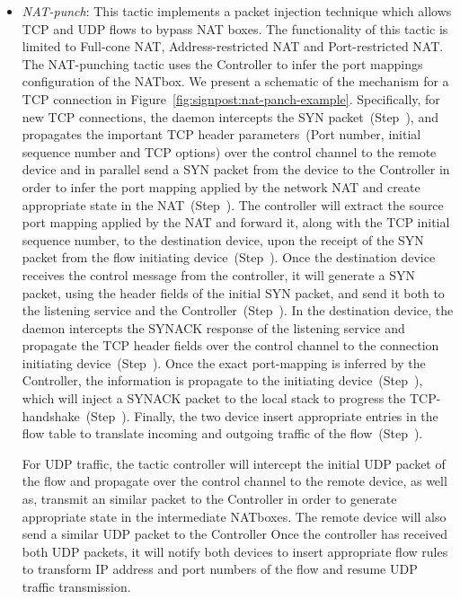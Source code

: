 \begin{itemize}
  \item \emph{NAT-punch}: This tactic implements a packet injection technique which
    allows TCP and UDP flows to bypass NAT boxes. The functionality of this
    tactic is limited to Full-cone NAT,
    Address-restricted NAT and Port-restricted NAT.  
    The NAT-punching tactic uses the Controller to
    infer the port mappings configuration of the NATbox. We present a schematic
    of the mechanism for a TCP connection in
    Figure~\ref{fig:signpost:nat-panch-example}. Specifically, for new TCP
    connections, the daemon intercepts the SYN packet~(Step~), and
    propagates the important TCP header parameters~(Port number, initial
    sequence number and TCP options) over the control channel to the remote
    device and in parallel send a SYN packet from the device to the Controller
    in order to infer the port mapping applied by the network
    NAT and create appropriate state in the NAT~(Step~). The controller  will extract the source port mapping
    applied by the NAT and forward it, along with the TCP initial sequence
    number, to the destination device, upon the receipt of the SYN packet from
    the flow initiating device~(Step~).  Once the destination device
    receives the control message from the controller, it will generate a SYN
    packet, using the header fields of the initial SYN packet, and send it both
    to the listening service and the \signpost Controller~(Step~). In
    the destination device, the \signpost daemon intercepts the SYNACK response
    of the listening service and propagate the TCP header fields over the
    control channel to the connection initiating device~(Step~).  Once
    the exact port-mapping is inferred by the Controller, the information is
    propagate to the initiating device~(Step~), which will inject a
    SYNACK packet to the local stack to progress the
    TCP-handshake~(Step~). Finally, the two device insert appropriate
    entries in the \of flow table to translate incoming and outgoing traffic of
    the flow~(Step~).

    For UDP traffic, the tactic controller will intercept the initial UDP packet
    of the flow and propagate over the control channel to the remote device, as
    well as, transmit an similar packet to the Controller in order to generate
    appropriate state in the intermediate NATboxes. The remote device will also
    send a similar UDP packet to the Controller Once the controller has received
    both UDP packets, it will notify both devices to insert appropriate flow
    rules to transform IP address and port numbers of the flow and resume UDP
    traffic transmission. 
\end{itemize}

